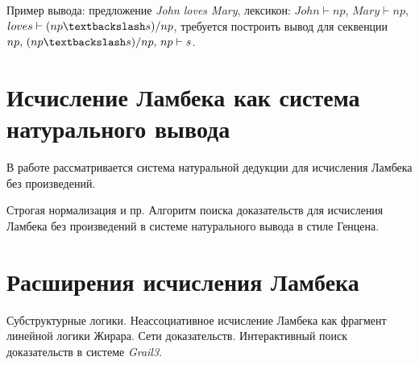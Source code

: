 Пример вывода: предложение \textit{John loves Mary}, лексикон: $John \vdash np$, $Mary \vdash np$, $loves \vdash (np \textbackslash s)/np$, требуется построить вывод для секвенции $np, \, (np \textbackslash s)/np, \, np \vdash s$.

\begin{prooftree}
\end{prooftree}


\section{Исчисление Ламбека как система натурального вывода}

В работе \parencite{konig1989parsing} рассматривается система натуральной дедукции для исчисления Ламбека без произведений.

Строгая нормализация и пр. Алгоритм поиска доказательств для исчисления Ламбека без произведений в системе натурального вывода в стиле Генцена.

\section{Расширения исчисления Ламбека}

Субструктурные логики. Неассоциативное исчисление Ламбека как фрагмент линейной логики Жирара. Сети доказательств. Интерактивный поиск доказательств в системе \textit{Grail3}.